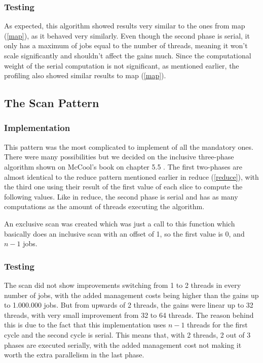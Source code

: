 \documentclass[10pt,journal]{IEEEtran}
\begin{document}
\subsubsection{Testing}

As expected, this algorithm showed results very similar to the ones from map (\ref{map}), as it behaved very similarly. Even though the second phase is serial, it only has a maximum of jobs equal to the number of threads, meaning it won't scale significantly and shouldn't affect the gains much. Since the computational weight of the serial computation is not significant, as mentioned earlier, the profiling also showed similar results to map (\ref{map}).

\subsection{The Scan Pattern}
\label{scan}

\subsubsection{Implementation}

This pattern was the most complicated to implement of all the mandatory ones. There were many possibilities but we decided on the inclusive three-phase algorithm shown on McCool's book on chapter 5.5 \cite{mccool}. The first two-phases are almost identical to the reduce pattern mentioned earlier in reduce (\ref{reduce}), with the third one using their result of the first value of each slice to compute the following values. Like in reduce, the second phase is serial and has as many computations as the amount of threads executing the algorithm. 

An exclusive scan was created which was just a call to this function which basically does an inclusive scan with an offset of 1, so the first value is 0, and $ n - 1 $ jobs.

\subsubsection{Testing}

The scan did not show improvements switching from 1 to 2 threads in every number of jobs, with the added management costs being higher than the gains up to 1.000.000 jobs. But from upwards of 2 threads, the gains were linear up to 32 threads, with very small improvement from 32 to 64 threads. The reason behind this is due to the fact that this implementation uses $ n - 1 $ threads for the first cycle and the second cycle is serial. This means that, with 2 threads, 2 out of 3 phases are executed serially, with the added management cost not making it worth the extra parallelism in the last phase.
\end{document}
